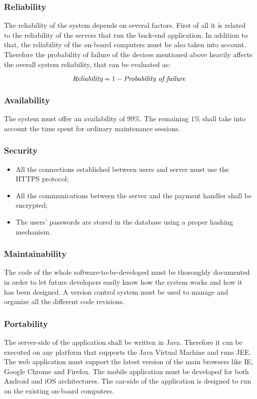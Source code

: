 \subsubsection{Reliability}
The reliability of the system depends on several factors. First of all it is related to the reliability of the servers that run the back-end application. In addition to that, the reliability of the on-board computers must be also taken into account. Therefore the probability of failure of the devices mentioned above heavily affects the overall system reliability, that can be evaluated as:
\begin{center}
	\[\emph{Reliability} = 1-\emph{Probability of failure}\]
\end{center}

\subsubsection{Availability}
The system must offer an availability of 99\%. The remaining 1\% shall take into account the time spent for ordinary maintenance sessions.

\subsubsection{Security}
\begin{itemize}
\item All the connections established between users and server must use the HTTPS protocol;
\item All the communications between the server and the payment handler shall be encrypted;
\item The users' passwords are stored in the database using a proper hashing mechanism.
\end{itemize}

\subsubsection{Maintainability}
The code of the whole software-to-be-developed must be thoroughly documented in order to let future developers easily know how the system works and how it has been designed. A version control system must be used to manage and organize all the different code revisions.

\subsubsection{Portability}
The server-side of the application shall be written in Java. Therefore it can be executed on any platform that supports the Java Virtual Machine and runs JEE. The web application must support the latest version of the main browsers like IE, Google Chrome and Firefox. The mobile application must be developed for both Android and iOS architectures.
The car-side of the application is designed to run on the existing on-board computers.
